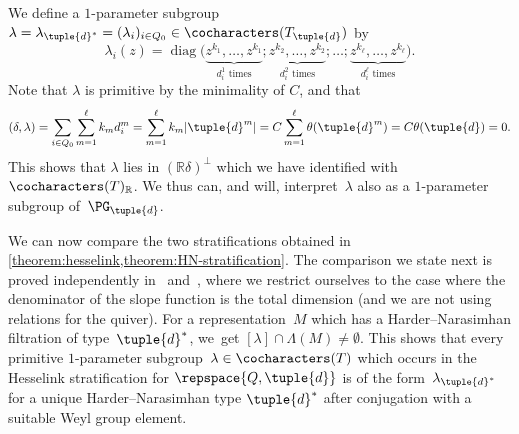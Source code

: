 We define a $1$-parameter subgroup $\lambda = \lambda_{\tuple{d}^*} = (\lambda_i)_{i \in Q_0} \in \cocharacters(T_{\tuple{d}})$ by
\begin{equation}
\label{equation:HN-type-1-PS-correspondence}
\lambda_i(z) = \operatorname{diag}\big( \underbrace{z^{k_1},\ldots,z^{k_1}}_{d_i^1 \text{ times}}; \underbrace{z^{k_2},\ldots,z^{k_2}}_{d_i^2 \text{ times}};\ldots; \underbrace{z^{k_\ell},\ldots,z^{k_\ell}}_{d_i^\ell \text{ times}} \big).
\end{equation}
Note that $\lambda$ is primitive by the minimality of $C$,
and that
\begin{equation*}
(\delta,\lambda)
=\sum_{i \in Q_0} \sum_{m=1}^\ell k_md_i^m
=\sum_{m=1}^\ell k_m|\tuple{d}^m|
=C\sum_{m=1}^\ell \theta(\tuple{d}^m)
=C\theta(\tuple{d})
= 0.
\end{equation*}
This shows that $\lambda$ lies in $(\mathbb{R}\delta)^\bot$
which we have identified with $\cocharacters(T)_\mathbb{R}$.
We thus can, and will, interpret~$\lambda$ also as a $1$-parameter subgroup of~$\PG_{\tuple{d}}$.

We can now compare the two stratifications obtained in \cref{theorem:hesselink,theorem:HN-stratification}.
The comparison we state next is proved independently in~\cite[Th.\,3.8]{MR3871820} and~\cite[Th.\,6.3]{MR3199484},
where we restrict ourselves to the case where the denominator of the slope function
is the total dimension (and we are not using relations for the quiver).
For a representation~$M$ which has a Harder--Narasimhan filtration of type~$\tuple{d}^*$, we~get $[\lambda] \cap \Lambda(M) \neq \emptyset$.
This shows that every primitive $1$-parameter subgroup~$\lambda \in \cocharacters(T)$
which occurs in the Hesselink stratification for $\repspace{Q,\tuple{d}}$
is of the form~$\lambda_{\tuple{d}^*}$
for a unique Harder--Narasimhan type $\tuple{d}^*$
after conjugation with a suitable Weyl group element.

